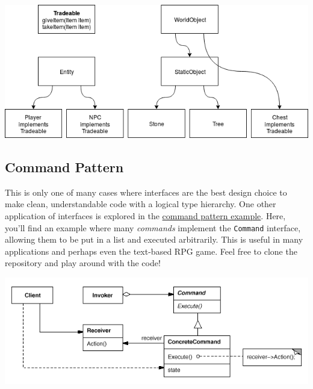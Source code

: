 \documentclass{article}
\begin{document}
    		\includegraphics[width=\textwidth]{images/interfaces/classesWithInterface.png}

    	\subsection{Command Pattern}
    		This is only one of many cases where interfaces are the best design choice to make clean, understandable code with a logical type hierarchy. One other application of interfaces is explored in the \href{https://github.com/andrewlalis/CommandPatternTutorial}{command pattern example}. Here, you'll find an example where many \textit{commands} implement the \verb|Command| interface, allowing them to be put in a list and executed arbitrarily. This is useful in many applications and perhaps even the text-based RPG game. Feel free to clone the repository and play around with the code!

    		\includegraphics[width=\textwidth]{images/interfaces/commandPattern.png}
\end{document}

